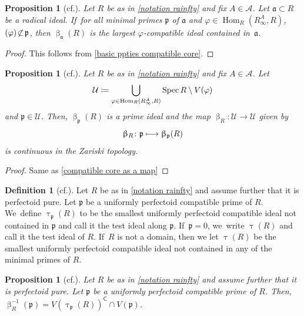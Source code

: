\documentclass[11pt]{article}
\newcommand{\cf}{cf.\xspace}
\let\autoref\cref
\newcommand\mto{\mathchoice{\longmapsto}{\mapsto}{\mapsto}{\mapsto}}
\theoremstyle{plain}
\newtheorem{proposition}[theorem]{Proposition}
\theoremstyle{definition}
\newtheorem{definition}[theorem]{Definition}
\numberwithin{equation}{theorem}
\newcommand{\fra}{\mathfrak{a}}
\newcommand{\p}{\mathfrak{p}}
\DeclareMathOperator{\Hom}{Hom}
\let\Im\relax
\DeclareMathOperator{\Im}{Im}
\DeclareMathOperator{\Spec}{{Spec}}
\newcommand{\nsubset}{\not\subset}
\newcommand{\sA}{\mathcal{A}}
\newcommand{\sU}{\mathcal{U}}
\renewcommand{\phi}{\varphi}
\newcommand{\inv}{^{-1}}
\newcommand{\rafty}{R^A_\infty}
\begin{document}
\begin{proposition}[{\cf \cite[Cor.\,3.14]{BrosowskyCartierCoreMap}}]
Let $R$ be as in \autoref{notation rainfty} and fix $A\in \sA$. Let $\fra\subset R$ be a radical ideal. If~for all minimal primes $\p$ of $\fra$ and $\phi\in \Hom_R\left(\rafty,R\right)$, $\Im(\phi)\!\nsubset\! \p$, then
$\upbeta_\fra(R)$ is the largest $\phi$-compatible ideal contained in~$\fra$.
\end{proposition}

\begin{proof}
This follows from \autoref{basic ppties compatible core}.
\end{proof}

\begin{proposition}[{\cf \cite[Th.\,3.3]{BrosowskyCartierCoreMap}}]
Let $R$ be as in \autoref{notation rainfty} and fix $A\in \sA$. Let
\[
\sU\coloneqq \bigcup_{\phi\in \Hom_R\left(\rafty,R\right)} \Spec R\setminus V(\Im\phi)
\]
and $\p\in \sU$.
Then, $\upbeta_\p(R)$ is a prime ideal and the map $\upbeta_{R}\colon \sU \to \sU$ given by
\[
\upbeta_{R}\colon \p \mto \upbeta_\p(R)
\]
is continuous in the Zariski topology.
\end{proposition}

\begin{proof}
Same as \autoref{compatible core as a map}
\end{proof}

\begin{definition}[{\cf \cite{TakagiHigherDimensionalAdjoint, SmolkinSubadditivity}}]
Let $R$ be as in \autoref{notation rainfty} and assume further that it is perfectoid pure. Let $\p$ be a uniformly perfectoid compatible prime of $R$. We~define $\uptau_\p(R)$ to be the smallest uniformly perfectoid compatible ideal not contained in $\p$ and call it the test ideal along $\p$. If~$\p=0$, we~write $\uptau(R)$ and call it the test ideal of $R$. If~$R$ is not a domain, then we let $\uptau(R)$ be the smallest uniformly perfectoid compatible ideal not contained in any of the minimal primes of $R$.
\end{definition}

\begin{proposition}[{\cf \cite[Prop.\,4.20]{CarvajalFayolleTameRamificationCFPS}}]\label{fibers of beta are tau}
Let $R$ be as in \autoref{notation rainfty} and assume further that it is perfectoid pure. Let $\p$ be a uniformly perfectoid compatible prime of $R$. Then, $\upbeta\inv_{R}(\p)=V(\uptau_\p(R))^\mathsf{C}\cap V(\p)$.
\end{proposition}
\end{document}
